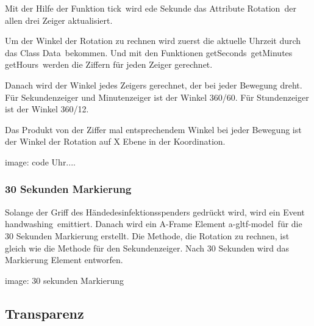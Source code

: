  Mit der Hilfe der Funktion \glqq tick\grqq\ wird ede Sekunde das Attribute \glqq Rotation\grqq\ der allen drei Zeiger aktualisiert. 
 
 Um der Winkel der Rotation zu rechnen wird zuerst die aktuelle Uhrzeit durch das Class \glqq Data\grqq\ bekommen. Und mit den Funktionen \glqq getSeconds\grqq\, \glqq getMinutes\grqq\, \glqq getHours\grqq\ werden die Ziffern für jeden Zeiger gerechnet.
 
 Danach wird der Winkel jedes Zeigers gerechnet, der bei jeder Bewegung dreht. Für Sekundenzeiger und Minutenzeiger ist der Winkel 360/60. Für Stundenzeiger ist der Winkel 360/12.
 
 Das Produkt von der Ziffer mal entsprechendem Winkel bei jeder Bewegung ist der Winkel der Rotation auf X Ebene in der Koordination.
 
 image: code Uhr....
 
 \subsubsection{30 Sekunden Markierung}
 Solange der Griff des Händedesinfektionsspenders gedrückt wird, wird ein Event \glqq handwashing\grqq\ emittiert. Danach wird ein A-Frame Element \glqq a-gltf-model\grqq\ für die 30 Sekunden Markierung erstellt. Die Methode, die Rotation zu rechnen, ist gleich wie die Methode für den Sekundenzeiger. Nach 30 Sekunden wird das Markierung Element entworfen.
 
 image: 30 sekunden Markierung
 
 
 \subsection{Transparenz}
 

